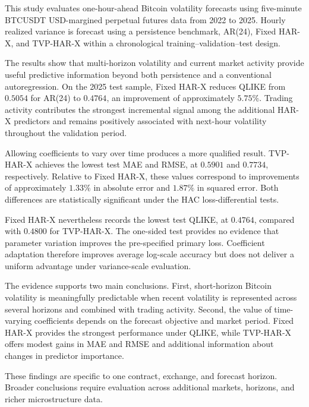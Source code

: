 This study evaluates one-hour-ahead Bitcoin volatility
forecasts using five-minute BTCUSDT USD-margined perpetual
futures data from 2022 to 2025. Hourly realized variance is
forecast using a persistence benchmark, AR(24), Fixed HAR-X,
and TVP-HAR-X within a chronological
training--validation--test design.

The results show that multi-horizon volatility and current
market activity provide useful predictive information beyond
both persistence and a conventional autoregression. On the
2025 test sample, Fixed HAR-X reduces QLIKE from \(0.5054\)
for AR(24) to \(0.4764\), an improvement of approximately
\(5.75\%\). Trading activity contributes the strongest
incremental signal among the additional HAR-X predictors and
remains positively associated with next-hour volatility
throughout the validation period.

Allowing coefficients to vary over time produces a more
qualified result. TVP-HAR-X achieves the lowest test MAE and
RMSE, at \(0.5901\) and \(0.7734\), respectively. Relative to
Fixed HAR-X, these values correspond to improvements of
approximately \(1.33\%\) in absolute error and \(1.87\%\) in
squared error. Both differences are statistically significant
under the HAC loss-differential tests.

Fixed HAR-X nevertheless records the lowest test QLIKE,
at \(0.4764\), compared with \(0.4800\) for TVP-HAR-X. The
one-sided test provides no evidence that parameter variation
improves the pre-specified primary loss. Coefficient adaptation
therefore improves average log-scale accuracy but does not
deliver a uniform advantage under variance-scale evaluation.

The evidence supports two main conclusions. First,
short-horizon Bitcoin volatility is meaningfully predictable
when recent volatility is represented across several horizons
and combined with trading activity. Second, the value of
time-varying coefficients depends on the forecast objective
and market period. Fixed HAR-X provides the strongest
performance under QLIKE, while TVP-HAR-X offers modest gains
in MAE and RMSE and additional information about changes in
predictor importance.

These findings are specific to one contract, exchange, and
forecast horizon. Broader conclusions require evaluation
across additional markets, horizons, and richer
microstructure data.